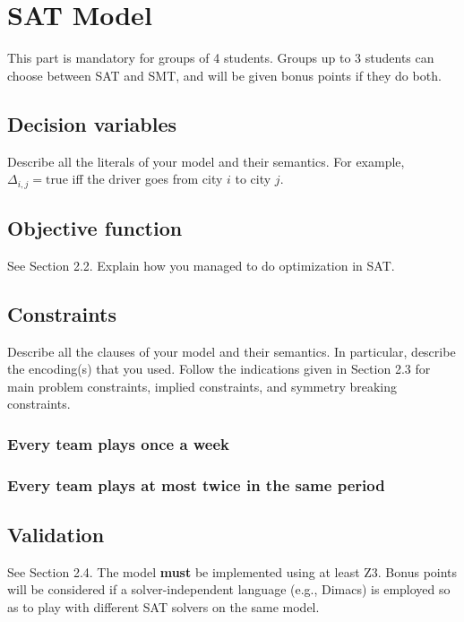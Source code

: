 \documentclass{article}
\begin{document}
\section{SAT Model}
This part is mandatory for groups of 4 students. Groups up to 3 students can choose between SAT and SMT, and will be given bonus points if they do both.

\subsection{Decision variables}
Describe all the literals of your model and their semantics. For example, $\Delta_{i,j} = \text{true}$ iff the driver goes from city $i$ to city $j$.

\subsection{Objective function}
See Section 2.2. Explain how you managed to do optimization in SAT.

\subsection{Constraints}
Describe all the clauses of your model and their semantics. In particular, describe the encoding(s) that you used. Follow the indications given in Section 2.3 for main problem constraints, implied constraints, and symmetry breaking constraints.
\subsubsection{Every team plays once a week}
\subsubsection{Every team plays at most twice in the same period}
\subsection{Validation}
See Section 2.4. The model \textbf{must} be implemented using at least Z3. Bonus points will be considered if a solver-independent language (e.g., Dimacs) is employed so as to play with different SAT solvers on the same model.
\end{document}
